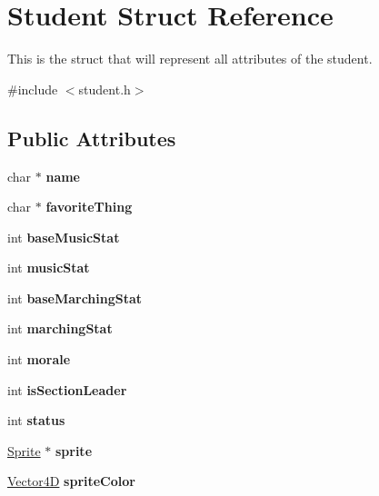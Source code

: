 \hypertarget{struct_student}{}\section{Student Struct Reference}
\label{struct_student}


This is the struct that will represent all attributes of the student.  




{\ttfamily \#include $<$student.\+h$>$}

\subsection*{Public Attributes}
\begin{DoxyCompactItemize}
\item 
\mbox{\label{struct_student_a7bff7ff985757c54c997bd970bbb63c8}} 
char $\ast$ {\bfseries name}
\item 
\mbox{\label{struct_student_a075a622d4cefdd88c0fa4c468f042e88}} 
char $\ast$ {\bfseries favorite\+Thing}
\item 
\mbox{\label{struct_student_a9fcaf59fe27f32a140498e8b676836f2}} 
int {\bfseries base\+Music\+Stat}
\item 
\mbox{\label{struct_student_af3c94c4bdbd80e4dc6dc517dc96fb58a}} 
int {\bfseries music\+Stat}
\item 
\mbox{\label{struct_student_aabdbfe90fd185023d7d2cabaa7b9ebce}} 
int {\bfseries base\+Marching\+Stat}
\item 
\mbox{\label{struct_student_a491935a34d7a4894b12a1825a24c053a}} 
int {\bfseries marching\+Stat}
\item 
\mbox{\label{struct_student_a64b55a39bb1dad6167f0017c78a70ac7}} 
int {\bfseries morale}
\item 
\mbox{\label{struct_student_a2774294149cc9104c58905302c9765c8}} 
int {\bfseries is\+Section\+Leader}
\item 
\mbox{\label{struct_student_a3f6f0d1198b3ffb8749b2f8e2b5a18c1}} 
int {\bfseries status}
\item 
\mbox{\label{struct_student_a433e3a0afa7a47cc6372e7c1ae86e2b5}} 
\hyperlink{struct_sprite___s}{Sprite} $\ast$ {\bfseries sprite}
\item 
\mbox{\label{struct_student_a5fccd30060d1cf0c830bbfbceb6c4e9c}} 
\hyperlink{struct_vector4_d}{Vector4D} {\bfseries sprite\+Color}
\end{DoxyCompactItemize}


